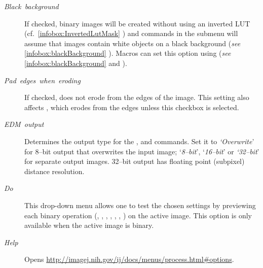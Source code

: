 \begin{minipage}[c][1\totalheight][t]{0.58\columnwidth}%
\begin{description}
\item [{\emph{Black\ background}}] If checked, binary images will be created
without using an inverted LUT (cf.\ \ref{infobox:InvertedLutMask}
) and commands
in the  submenu
will assume that images contain white objects on a black background
(\emph{see} \ref{infobox:blackBackground} ).
Macros can set this option using 
(\emph{see} \ref{infobox:blackBackground} 
and ).
\item [{\emph{Pad}\ \emph{edges}\ \emph{when}\ \emph{eroding}}] If checked,
 does not erode
from the edges of the image. This setting also affects ,
which erodes from the edges unless this checkbox is selected.\end{description}
%
\end{minipage}
\begin{description}
\item [{\emph{EDM\ output}}] Determines the output type for the ,
 and 
commands. Set it to \emph{`Overwrite}' for 8--bit output that overwrites
the input image; `\emph{8--bit}', `\emph{16--bit}' or \emph{`32--bit}'
for separate output images. 32--bit output has floating point (subpixel)
distance resolution.
\item [{\emph{Do}}] This drop-down menu allows one to test the chosen settings
by previewing each binary operation (,
, ,
, ,
, )
on the active image. This option is only available when the active
image is binary.
\item [{\emph{Help}}] Opens \href{http://imagej.nih.gov/ij/docs/menus/process.html\#options}{http://imagej.nih.gov/ij/docs/menus/process.html\#{}options}.
\end{description}
